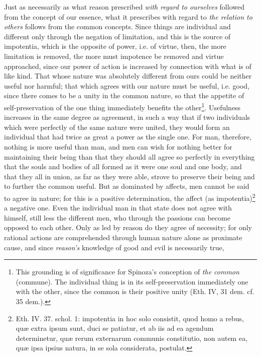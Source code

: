\documentclass[12pt,a4paper,openany]{book}
\newcommand{\opage}[1]{\marginnote{\footnotesize\textit{[#1]}}}
\begin{document}
\opage{126}\setcounter{footnote}{0}Just as necessarily as what reason prescribed \emph{with
regard to ourselves} followed from the concept of our essence, what
it prescribes with regard to \emph{the relation to others} follows
from the common concepts. Since things are individual
and different only through the negation of limitation, and this is
the source of impotentia, which is the opposite of power, i.e. of virtue,
then, the more limitation is removed, the more must impotence
be removed and virtue approached, since our power of action is increased by
connection with what is of like kind. That whose nature was absolutely
different from ours could be neither useful nor
harmful; that which agrees with our nature must
be useful, i.e. good, since there comes to be a unity in the common
nature, so that the appetite of self-preservation of the one thing immediately
benefits the other\footnote{This grounding is of significance for Spinoza's conception of \emph{the
common} (commune). The individual thing is in its self-preservation
immediately one with the other, since the common is their positive
unity (Eth. IV, 31 dem. cf. 35 dem.).}. Usefulness increases in the same
degree as agreement, in such a way that if two individuals
which were perfectly of the same nature were united, they would
form an individual that had twice as great a power
as the single one. For man, therefore, nothing is more useful
than man, and men can wish for nothing
better for maintaining their being than that they should all agree
so perfectly in everything that the souls and
bodies of all formed as it were one soul and one body, and that
they all in union, as far as they were able, strove to
preserve their being and to further the common useful. But
as dominated by affects, men cannot be said
to agree in nature; for this is a positive
determination, the affect (as impotentia)\footnote{Eth. IV. 37. schol. 1: impotentia in hoc solo consistit, quod homo a
rebus, quæ extra ipsum sunt, duci se patiatur, et ab iis ad ea agendum
determinetur, quæ rerum externarum communis constitutio,
non autem ea, quæ ipsa ipsius natura, in se sola considerata,
postulat.} a negative one. Even
the individual man in that state does not agree
\opage{127}\setcounter{footnote}{0}with himself, still less the different men, who through the
passions can become opposed to each other. Only as led
by reason do they agree of necessity; for
only rational actions are comprehended through human
nature alone as proximate cause, and since \emph{reason's}
knowledge of good and evil is necessarily true,
\end{document}
